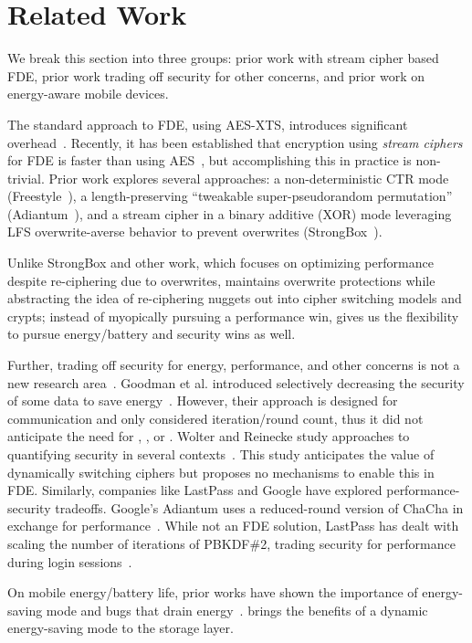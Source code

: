 \section{Related Work}\label{sec:related}

We break this section into three groups: prior work with stream cipher based
FDE, prior work trading off security for other concerns, and prior work on
energy-aware mobile devices.

 The standard approach to FDE, using AES-XTS,
introduces significant overhead~\cite{AESItself}. Recently, it has been
established that encryption using \emph{stream ciphers} for FDE is faster than
using AES~\cite{StrongBox}, but accomplishing this in practice is non-trivial.
Prior work explores several approaches: a non-deterministic CTR mode
(Freestyle~\cite{Freestyle}), a length-preserving ``tweakable super-pseudorandom
permutation'' (Adiantum~\cite{Adiantum}), and a stream cipher in a binary
additive (XOR) mode leveraging LFS overwrite-averse behavior to prevent
overwrites (StrongBox~\cite{StrongBox}).

Unlike StrongBox and other work, which focuses on optimizing performance despite
re-ciphering due to overwrites, \sys maintains overwrite protections while
abstracting the idea of re-ciphering nuggets out into cipher switching models
and crypts; instead of myopically pursuing a performance win, \sys gives us the
flexibility to pursue energy/battery and security wins as well.

 Further, trading off security for
energy, performance, and other concerns is not a new research
area~\cite{ScalableSecurity, WolterReinecke, ZengChow1, HaleemEtAl,
LiOmiecinski, Merkel4, Merkle3}. Goodman et al. introduced selectively
decreasing the security of some data to save energy~\cite{ScalableSecurity}.
However, their approach is designed for communication and only considered
iteration/round count, thus it did not anticipate the need for \sysA, \sysB, or
\sysC. Wolter and Reinecke study approaches to quantifying security in several
contexts~\cite{WolterReinecke}. This study anticipates the value of dynamically
switching ciphers but proposes no mechanisms to enable this in FDE. Similarly,
companies like LastPass and Google have explored performance-security tradeoffs.
Google's Adiantum uses a reduced-round version of ChaCha in exchange for
performance~\cite{Adiantum}. While not an FDE solution, LastPass has dealt with
scaling the number of iterations of PBKDF\#2, trading security for performance
during login sessions~\cite{LastPass}.

 On mobile energy/battery life, prior works
have shown the importance of energy-saving mode and bugs that drain
energy~\cite{energy-doctor, power-aware}. \sys brings the benefits of a dynamic
energy-saving mode to the storage layer.
